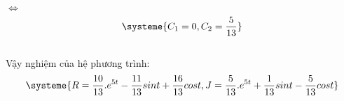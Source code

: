     $\Longleftrightarrow$
    \begin{equation}
        \systeme{
            C_1 = 0,
            C_2 = \frac{5}{13}
        }\label{eq:equation2}
    \end{equation} \\

    Vậy nghiệm của hệ phương trình: \\
    \begin{equation}
        \systeme{
            R=\frac{10}{13}.e^{5t}-\frac{11}{13}sint+\frac{16}{13}cost,
            J=\frac{5}{13}.e^{5t}+\frac{1}{13}sint-\frac{5}{13}cost
        }\label{eq:equation2}
    \end{equation} \\

